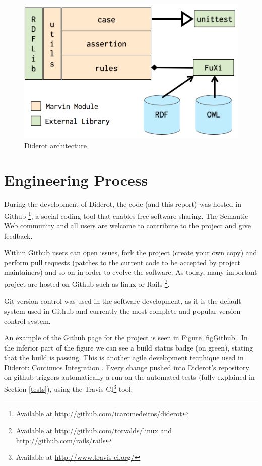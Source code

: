 \documentclass{report}
\begin{document}
\begin{figure}[!hbt]
    \centering
    \label{figArchitecture}
    \caption{Diderot architecture}
    \includegraphics[scale=0.33]{fig/architecture.png}
\end{figure}

\section{Engineering Process}

During the development of Diderot, the code (and this report) was hosted in Github
\footnote{Available at \url{http://github.com/icaromedeiros/diderot}}, a social coding tool that enables free software
sharing. The Semantic Web community and all users are welcome to contribute to the project and give feedback.

Within Github users can open issues, fork the project (create your own copy) and perform pull requests (patches to the
current code to be accepted by project maintainers) and so on in order to evolve the software. As today, many
important project are hosted on Github such as linux or Rails \footnote{Available at \url{http://github.com/torvalds/linux}
and \url{http://github.com/rails/rails}}.

Git version control was used in the software development, as it is the
default system used in Github and currently the most complete and popular version control system.

An example of the Github page for the project is seen in Figure \ref{figGithub}. In the inferior part of the figure we can see a build status badge (on green), stating that the build is passing. This is another agile development tecnhique used in Diderot: Continuos Integration \cite{beck04}. Every change pushed into Diderot's repository on github triggers automatically a run on the automated tests (fully explained in Section \ref{tests}), using the Travis CI\footnote{Available at \url{http://www.travis-ci.org/}} tool.
\end{document}
